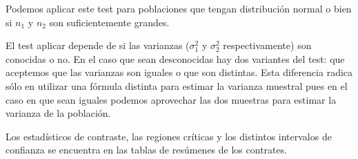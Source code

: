 \documentclass[12pt]{report}
\begin{document}
Podemos aplicar este test para poblaciones que tengan distribución normal  o bien si $n_1$ y $n_2$ son suficientemente grandes.

El test aplicar depende de si las varianzas ($\sigma^2_1$ y $\sigma^2_2$ respectivamente) son conocidas o no. En el caso que sean desconocidas hay dos variantes del test: que aceptemos que las varianzas son iguales o que son distintas. Esta diferencia radica sólo en utilizar una fórmula distinta para estimar la varianza muestral pues en el caso en que sean iguales podemos aprovechar las dos muestras para estimar la varianza de la población.

Los estadísticos de contraste, las regiones críticas y los distintos intervalos de confianza se encuentra en las tablas de resúmenes de los contrates.
\end{document}
